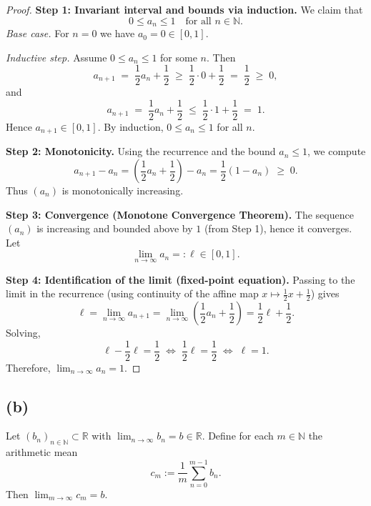 \documentclass[12pt,a4paper]{article}
\theoremstyle{definition}
\theoremstyle{remark}
\begin{document}
\begin{proof}
\textbf{Step 1: Invariant interval and bounds via induction.}
We claim that
\[
0 \le a_n \le 1 \quad \text{for all } n \in \mathbb{N}.
\]
\emph{Base case.} For $n=0$ we have $a_0=0 \in [0,1]$.

\emph{Inductive step.} Assume $0 \le a_n \le 1$ for some $n$. Then
\[
a_{n+1} \;=\; \frac{1}{2}a_n + \frac{1}{2}
\;\ge\; \frac{1}{2}\cdot 0 + \frac{1}{2} \;=\; \frac{1}{2} \;\ge\; 0,
\]
and
\[
a_{n+1} \;=\; \frac{1}{2}a_n + \frac{1}{2}
\;\le\; \frac{1}{2}\cdot 1 + \frac{1}{2} \;=\; 1.
\]
Hence $a_{n+1} \in [0,1]$. By induction, $0 \le a_n \le 1$ for all $n$.

\medskip
\textbf{Step 2: Monotonicity.}
Using the recurrence and the bound $a_n \le 1$, we compute
\[
a_{n+1} - a_n
= \left(\frac{1}{2}a_n + \frac{1}{2}\right) - a_n
= \frac{1}{2}(1 - a_n)
\;\ge\; 0.
\]
Thus $(a_n)$ is monotonically increasing.

\medskip
\textbf{Step 3: Convergence (Monotone Convergence Theorem).}
The sequence $(a_n)$ is increasing and bounded above by $1$ (from Step 1), hence it converges. Let
\[
\lim_{n\to\infty} a_n =: \ell \in [0,1].
\]

\medskip
\textbf{Step 4: Identification of the limit (fixed-point equation).}
Passing to the limit in the recurrence (using continuity of the affine map $x \mapsto \tfrac12 x + \tfrac12$) gives
\[
\ell = \lim_{n\to\infty} a_{n+1}
= \lim_{n\to\infty} \left(\frac{1}{2}a_n + \frac{1}{2}\right)
= \frac{1}{2}\ell + \frac{1}{2}.
\]
Solving,
\[
\ell - \frac{1}{2}\ell = \frac{1}{2}
\;\Longleftrightarrow\;
\frac{1}{2}\ell = \frac{1}{2}
\;\Longleftrightarrow\;
\ell = 1.
\]
Therefore, $\lim_{n\to\infty} a_n = 1$.
\end{proof}



\subsection*{(b)}
Let $(b_n)_{n\in\mathbb{N}} \subset \mathbb{R}$ with $\lim_{n\to\infty} b_n = b \in \mathbb{R}$.
Define for each $m\in\mathbb{N}$ the arithmetic mean
\[
c_m := \frac{1}{m}\sum_{n=0}^{m-1} b_n.
\]
Then $\displaystyle \lim_{m\to\infty} c_m = b$.
\end{document}
